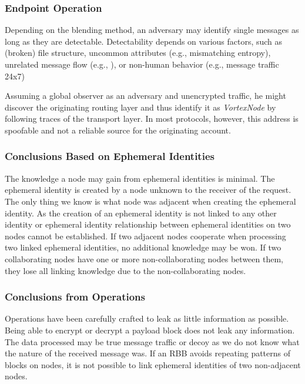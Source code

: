 \documentclass[acmsmall, screen]{acmart}
\begin{document}
\subsubsection{Endpoint Operation}
Depending on the blending method, an adversary may identify single messages as long as they are detectable. Detectability depends on various factors, such as (broken) file structure, uncommon attributes (e.g., mismatching entropy), unrelated message flow (e.g., \cite{oakland2013-parrot}), or non-human behavior (e.g., message traffic 24x7)

Assuming a global observer as an adversary and unencrypted traffic, he might discover the originating routing layer and thus identify it as \emph{VortexNode} by following traces of the transport layer. In most protocols, however, this address is spoofable and not a reliable source for the originating account.

\subsubsection{Conclusions Based on Ephemeral Identities}
The knowledge a node may gain from ephemeral identities is minimal. The ephemeral identity is created by a node unknown to the receiver of the request. The only thing we know is what node was adjacent when creating the ephemeral identity. As the creation of an ephemeral identity is not linked to any other identity or ephemeral identity relationship between ephemeral identities on two nodes cannot be established. If two adjacent nodes cooperate when processing two linked ephemeral identities, no additional knowledge may be won. If two collaborating nodes have one or more non-collaborating nodes between them, they lose all linking knowledge due to the non-collaborating nodes. 

\subsubsection{Conclusions from Operations}
Operations have been carefully crafted to leak as little information as possible. Being able to encrypt or decrypt a payload block does not leak any information. The data processed may be true message traffic or decoy as we do not know what the nature of the received message was. If an RBB avoids repeating patterns of blocks on nodes, it is not possible to link ephemeral identities of two non-adjacent nodes. 
\end{document}
